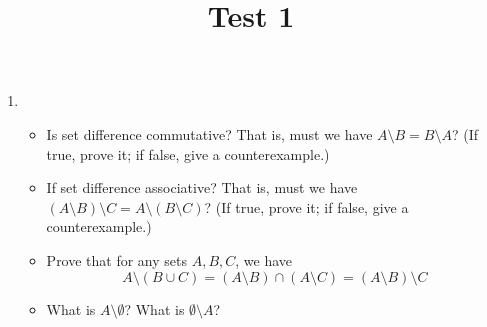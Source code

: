 \documentclass[10pt,a4paper,oneside]{book}
\title{Test 1}
\author{}
\date{}
\begin{document}
\maketitle

\begin{enumerate}
    \item  
    \begin{itemize}
        \item Is set difference commutative? That is, must we have $A\setminus B = B\setminus A$? (If true, prove it; if false, give a counterexample.)
        \item If set difference associative? That is, must we have $(A\setminus B)\setminus C = A\setminus(B\setminus C)$? (If true, prove it; if false, give a counterexample.)
        \item Prove that for any sets $A,B,C$, we have 
        \[A\setminus (B\cup C) = (A\setminus B)\cap (A\setminus C)=(A\setminus B)\setminus C\]
        \item What is $A\setminus \emptyset$? What is $\emptyset \setminus A$?
    \end{itemize}
 
\end{enumerate}
\end{document}
